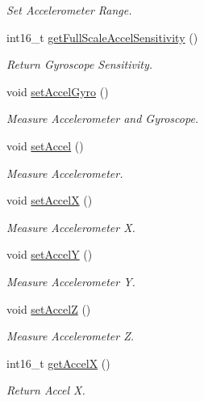 \begin{DoxyCompactItemize}
\begin{DoxyCompactList}\small\item\em Set Accelerometer Range. \end{DoxyCompactList}\item 
int16\+\_\+t \mbox{\hyperlink{class_m_p_u6050_afb431ff03c361fbbfc43e668996be195}{get\+Full\+Scale\+Accel\+Sensitivity}} ()
\begin{DoxyCompactList}\small\item\em Return Gyroscope Sensitivity. \end{DoxyCompactList}\item 
void \mbox{\hyperlink{class_m_p_u6050_a25bc66e46d8f4ddfcd75b9e04c3d51b9}{set\+Accel\+Gyro}} ()
\begin{DoxyCompactList}\small\item\em Measure Accelerometer and Gyroscope. \end{DoxyCompactList}\item 
void \mbox{\hyperlink{class_m_p_u6050_ab4b3c0b6ac0c3217bf72739ede81f31b}{set\+Accel}} ()
\begin{DoxyCompactList}\small\item\em Measure Accelerometer. \end{DoxyCompactList}\item 
void \mbox{\hyperlink{class_m_p_u6050_a99382dd9d3e36f575a020d6f5ee0631a}{set\+AccelX}} ()
\begin{DoxyCompactList}\small\item\em Measure Accelerometer X. \end{DoxyCompactList}\item 
void \mbox{\hyperlink{class_m_p_u6050_ab2a793e509a772f3e67990194b774688}{set\+AccelY}} ()
\begin{DoxyCompactList}\small\item\em Measure Accelerometer Y. \end{DoxyCompactList}\item 
void \mbox{\hyperlink{class_m_p_u6050_aee6033621345411ef54bca39bdcb7b19}{set\+AccelZ}} ()
\begin{DoxyCompactList}\small\item\em Measure Accelerometer Z. \end{DoxyCompactList}\item 
int16\+\_\+t \mbox{\hyperlink{class_m_p_u6050_aec768f09d9fb4a578a67ac56cefb1f65}{get\+AccelX}} ()
\begin{DoxyCompactList}\small\item\em Return Accel X. \end{DoxyCompactList}\item 

\end{DoxyCompactItemize}

